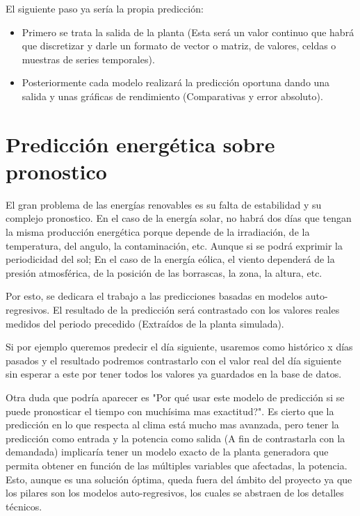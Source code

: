 El siguiente paso ya sería la propia predicción: 

\begin{itemize}
	\item Primero se trata la salida de la planta (Esta será un valor continuo que habrá que discretizar y darle un formato de vector o matriz, de valores, celdas o muestras de series temporales).
	\item Posteriormente cada modelo realizará la predicción oportuna dando una salida y unas gráficas de rendimiento (Comparativas y error absoluto). 
\end{itemize}



\section{Predicción energética sobre pronostico} 
\label{sec:prediccion_energetica_sobre_pronostico}

El gran problema de las energías renovables es su falta de estabilidad y su complejo pronostico. En el caso de la energía solar, no habrá dos días que tengan la misma producción energética porque depende de la irradiación, de la temperatura, del angulo, la contaminación, etc. Aunque si se podrá exprimir la periodicidad del sol; En el caso de la energía eólica, el viento dependerá de la presión atmosférica, de la posición de las borrascas, la zona, la altura, etc.

Por esto, se dedicara el trabajo a las predicciones basadas en modelos auto-regresivos.
El resultado de la predicción será contrastado con los valores reales medidos del periodo precedido (Extraídos de la planta simulada).

Si por ejemplo queremos predecir el día siguiente, usaremos como histórico x días pasados y el resultado podremos contrastarlo con el valor real del día siguiente sin esperar a este por tener todos los valores ya guardados en la base de datos.

Otra duda que podría aparecer es "Por qué usar este modelo de predicción si se puede pronosticar el tiempo con muchísima mas exactitud?". Es cierto que la predicción en lo que respecta al clima está mucho mas avanzada, pero tener la predicción como entrada y la potencia como salida (A fin de contrastarla con la demandada) implicaría tener un modelo exacto de la planta generadora que permita obtener en función de las múltiples variables que afectadas, la potencia. Esto, aunque es una solución óptima, queda fuera del ámbito del proyecto ya que los pilares son los modelos auto-regresivos, los cuales se abstraen de los detalles técnicos. 

